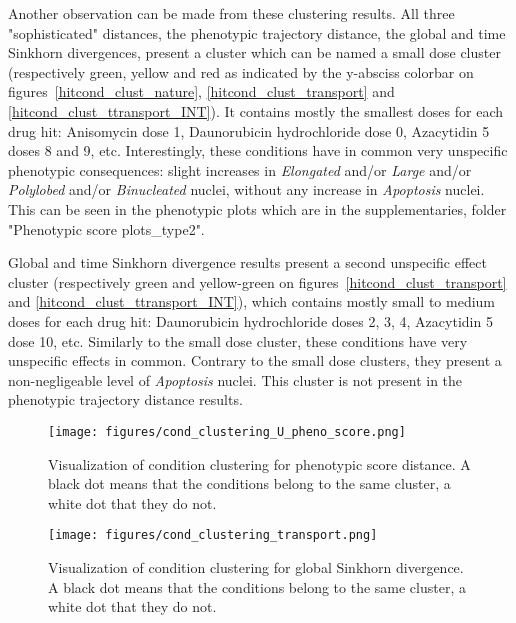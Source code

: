 Another observation can be made from these clustering results. All three "sophisticated" distances, the phenotypic trajectory distance, the global and time Sinkhorn divergences, present a cluster which can be named a small dose cluster (respectively green, yellow and red as indicated by the y-absciss colorbar on figures~\ref{hitcond_clust_nature}, \ref{hitcond_clust_transport} and \ref{hitcond_clust_ttransport_INT}). It contains mostly the smallest doses for each drug hit: Anisomycin dose 1, Daunorubicin hydrochloride dose 0, Azacytidin 5 doses 8 and 9, etc. Interestingly, these conditions have in common very unspecific phenotypic consequences: slight increases in \textit{Elongated} and/or \textit{Large} and/or \textit{Polylobed} and/or \textit{Binucleated} nuclei, without any increase in \textit{Apoptosis} nuclei. This can be seen in the phenotypic plots which are in the supplementaries, folder "Phenotypic score plots\_type2".

Global and time Sinkhorn divergence results present a second unspecific effect cluster (respectively green and yellow-green on figures~\ref{hitcond_clust_transport} and \ref{hitcond_clust_ttransport_INT}), which contains mostly small to medium doses for each drug hit: Daunorubicin hydrochloride doses 2, 3, 4, Azacytidin 5 dose 10, etc. Similarly to the small dose cluster, these conditions have very unspecific effects in common. Contrary to the small dose clusters, they present a non-negligeable level of \textit{Apoptosis} nuclei. This cluster is not present in the phenotypic trajectory distance results.

\begin{figure*}[ht!]
\centerline{\texttt{[image: figures/cond\_clustering\_U\_pheno\_score.png]}}
\caption{Visualization of condition clustering for phenotypic score distance. A black dot means that the conditions belong to the same cluster, a white dot that they do not.}
\label{binary_map_ps}
\end{figure*}
\begin{figure*}[ht!]
\centerline{%
\texttt{[image: figures/cond\_clustering\_transport.png]} }
\caption{Visualization of condition clustering for global Sinkhorn divergence. A black dot means that the conditions belong to the same cluster, a white dot that they do not.}
\label{binary_map_transport}
\end{figure*}

